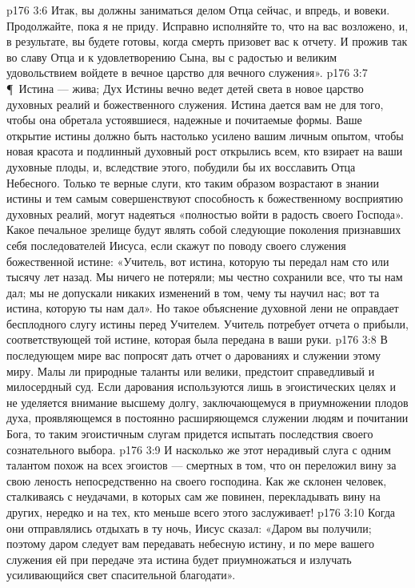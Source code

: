 \vs p176 3:6 Итак, вы должны заниматься делом Отца сейчас, и впредь, и вовеки. Продолжайте, пока я не приду. Исправно исполняйте то, что на вас возложено, и, в результате, вы будете готовы, когда смерть призовет вас к отчету. И прожив так во славу Отца и к удовлетворению Сына, вы с радостью и великим удовольствием войдете в вечное царство для вечного служения».
\vs p176 3:7 \P\ Истина --- жива; Дух Истины вечно ведет детей света в новое царство духовных реалий и божественного служения. Истина дается вам не для того, чтобы она обретала устоявшиеся, надежные и почитаемые формы. Ваше открытие истины должно быть настолько усилено вашим личным опытом, чтобы новая красота и подлинный духовный рост открылись всем, кто взирает на ваши духовные плоды, и, вследствие этого, побудили бы их восславить Отца Небесного. Только те верные слуги, кто таким образом возрастают в знании истины и тем самым совершенствуют способность к божественному восприятию духовных реалий, могут надеяться «полностью войти в радость своего Господа». Какое печальное зрелище будут являть собой следующие поколения признавших себя последователей Иисуса, если скажут по поводу своего служения божественной истине: «Учитель, вот истина, которую ты передал нам сто или тысячу лет назад. Мы ничего не потеряли; мы честно сохранили все, что ты нам дал; мы не допускали никаких изменений в том, чему ты научил нас; вот та истина, которую ты нам дал». Но такое объяснение духовной лени не оправдает бесплодного слугу истины перед Учителем. Учитель потребует отчета о прибыли, соответствующей той истине, которая была передана в ваши руки.
\vs p176 3:8 В последующем мире вас попросят дать отчет о дарованиях и служении этому миру. Малы ли природные таланты или велики, предстоит справедливый и милосердный суд. Если дарования используются лишь в эгоистических целях и не уделяется внимание высшему долгу, заключающемуся в приумножении плодов духа, проявляющемся в постоянно расширяющемся служении людям и почитании Бога, то таким эгоистичным слугам придется испытать последствия своего сознательного выбора.
\vs p176 3:9 И насколько же этот нерадивый слуга с одним талантом похож на всех эгоистов --- смертных в том, что он переложил вину за свою леность непосредственно на своего господина. Как же склонен человек, сталкиваясь с неудачами, в которых сам же повинен, перекладывать вину на других, нередко и на тех, кто меньше всего этого заслуживает!
\vs p176 3:10 Когда они отправлялись отдыхать в ту ночь, Иисус сказал: «Даром вы получили; поэтому даром следует вам передавать небесную истину, и по мере вашего служения ей при передаче эта истина будет приумножаться и излучать усиливающийся свет спасительной благодати».
